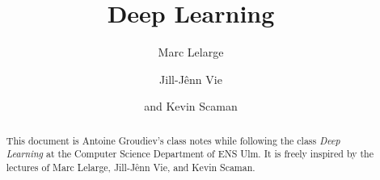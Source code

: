 \documentclass[toc, titlepaged]{../cs-classes/cs-classes}
\title{Deep Learning}
\author{Marc Lelarge\and Jill-Jênn Vie\and and Kevin Scaman}
\begin{document}
\begin{abstract}
    This document is Antoine Groudiev's class notes while following the class \emph{Deep Learning} at the Computer Science Department of ENS Ulm. It is freely inspired by the lectures of Marc Lelarge, Jill-Jênn Vie, and Kevin Scaman.
\end{abstract}





% 









\end{document}
